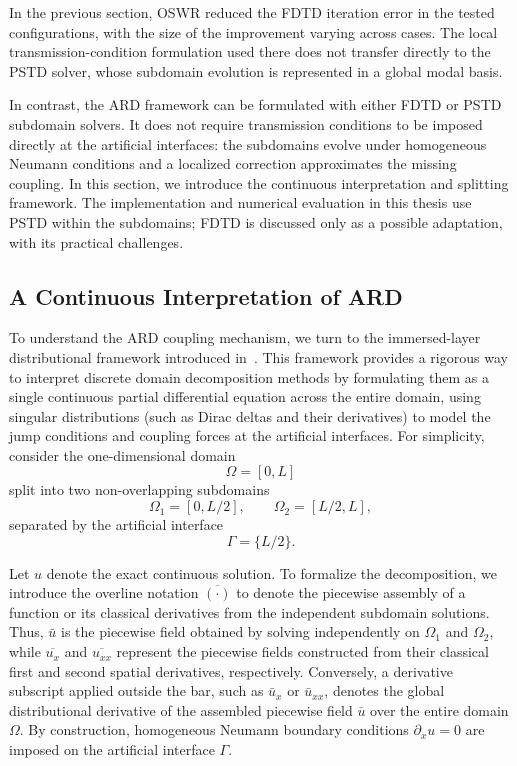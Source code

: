 \documentclass{Configuration_Files/PoliMi3i_thesis}
\newif\ifshowthesischanges
\DeclareRobustCommand{\thesischange}[2]{%
    \ifshowthesischanges
        \textcolor{#1}{#2}%
    \else
        #2%
    \fi
}
\def\thesischange#1#2{#2}%
\begin{document}
In the previous section, OSWR reduced the FDTD iteration error in the tested configurations, with the size of the improvement varying across cases. The local transmission-condition formulation used there does not transfer directly to the PSTD solver, whose subdomain evolution is represented in a global modal basis.

In contrast, the ARD framework can be formulated with either FDTD or PSTD subdomain solvers. It does not require transmission conditions to be imposed directly at the artificial interfaces: the subdomains evolve under homogeneous Neumann conditions and a localized correction approximates the missing coupling. In this section, we introduce the continuous interpretation and splitting framework. \thesischange{red}{The implementation and numerical evaluation in this thesis use PSTD within the subdomains; FDTD is discussed only as a possible adaptation, with its practical challenges.}

\subsection{A Continuous Interpretation of ARD}

To understand the ARD coupling mechanism, we turn to the immersed-layer distributional framework introduced in~\cite{eldredge_method_2022}. This framework provides a rigorous way to interpret discrete domain decomposition methods by formulating them as a single continuous partial differential equation across the entire domain, using singular distributions (such as Dirac deltas and their derivatives) to model the jump conditions and coupling forces at the artificial interfaces. For simplicity, consider the one-dimensional domain
\[
\Omega=[0,L]
\]
split into two non-overlapping subdomains
\[
\Omega_1=[0,L/2],\qquad
\Omega_2=[L/2,L],
\]
separated by the artificial interface
\[
\Gamma=\{L/2\}.
\]

Let $u$ denote the exact continuous solution. To formalize the decomposition, we introduce the overline notation $\overline{(\cdot)}$ to denote the piecewise assembly of a function or its classical derivatives from the independent subdomain solutions. Thus, $\bar{u}$ is the piecewise field obtained by solving independently on $\Omega_1$ and $\Omega_2$, while $\overline{u_x}$ and $\overline{u_{xx}}$ represent the piecewise fields constructed from their classical first and second spatial derivatives, respectively. Conversely, a derivative subscript applied outside the bar, such as $\bar{u}_x$ or $\bar{u}_{xx}$, denotes the global distributional derivative of the assembled piecewise field $\bar{u}$ over the entire domain $\Omega$. By construction, homogeneous Neumann boundary conditions $\partial_x u = 0$ are imposed on the artificial interface $\Gamma$.
\end{document}
